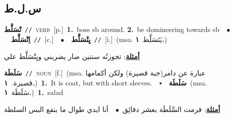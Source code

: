 \documentclass[10pt,a4paper,twoside]{article} %
\begin{document}
\begin{multicols}{2}
\vspace{-3mm}
\subsection*{\color{blue}\foreignlanguage{arabic}{س.ل.ط}\color{blue}{}} 

{\setlength\topsep{0pt}\textbf{\foreignlanguage{arabic}{تْسَلَّط}}\ {\color{gray}\texttt{//}\color{black}}\ \textsc{verb}\ [p.]\ \textbf{1.}~boss sb around.  \textbf{2.}~be domineering towards sb\ \ $\bullet$\ \ \setlength\topsep{0pt}\textbf{\foreignlanguage{arabic}{اِتْسَلَّط}}\ {\color{gray}\texttt{//}\color{black}}\ [c.]\ \ $\bullet$\ \ \setlength\topsep{0pt}\textbf{\foreignlanguage{arabic}{يِتْسَلَّط}}\ {\color{gray}\texttt{//}\color{black}}\ [i.]\ \color{gray}(msa. \foreignlanguage{arabic}{يَتَسَلَّط}~\foreignlanguage{arabic}{\textbf{١.}})\color{black}\  \begin{flushright}\color{gray}\foreignlanguage{arabic}{\textbf{\underline{\foreignlanguage{arabic}{أمثلة}}}: تجوزتُه سنتين صار يضربني ويِتْسَلَّط علي}\end{flushright}\color{black}} \vspace{2mm}

{\setlength\topsep{0pt}\textbf{\foreignlanguage{arabic}{سَلَطَة}}\ {\color{gray}\texttt{//}\color{black}}\ \textsc{noun}\ [f.]\ \color{gray}(msa. \foreignlanguage{arabic}{عبارة عن دامر(جبة قصيرة) ولكن أكمامها قصيرة.}~\foreignlanguage{arabic}{\textbf{١.}})\color{black}\ \textbf{1.}~It is coat, but with short sleeves.\ \ $\smblkdiamond$\ \ \setlength\topsep{0pt}\textbf{\foreignlanguage{arabic}{سَلَطَة}}\ \color{gray}(msa. \foreignlanguage{arabic}{سَلَطَة}~\foreignlanguage{arabic}{\textbf{١.}})\color{black}\ \textbf{1.}~salad\  \begin{flushright}\color{gray}\foreignlanguage{arabic}{\textbf{\underline{\foreignlanguage{arabic}{أمثلة}}}: فرمت السَّلَطَة بعشر دقائِق\ $\bullet$\ \  أنا ايدي طوال ما بنفع البس السلطة}\end{flushright}\color{black}} \vspace{2mm}


\end{multicols}
\end{document}
